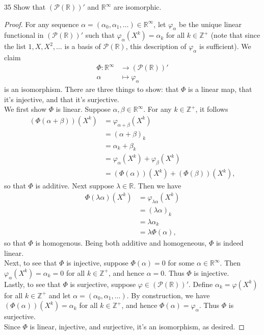\documentclass{extarticle}
\newenvironment{problem}[1]{\begin{prob*}{#1}{}}{\end{prob*}}
\newcommand{\Z}{\mathbb{Z}}
\newcommand{\R}{\mathbb{R}}
\newcommand{\poly}{\mathcal{P}}
\begin{document}
\begin{problem}{35}
Show that $(\poly(\R))'$ and $\R^\infty$ are isomorphic.
\end{problem}
\begin{proof}
For any sequence $\alpha = (\alpha_0,\alpha_1,\dots)\in\R^\infty$, let $\varphi_\alpha$ be the unique linear functional in $(\poly(\R))'$ such that $\varphi_\alpha(X^k) = \alpha_k$ for all $k\in\Z^+$ (note that since the list $1,X,X^2,\dots$ is a basis of $\poly(\R)$, this description of $\varphi_\alpha$ is sufficient).  We claim
\begin{align*}
\Phi: \R^\infty &\to (\poly(\R))'\\
\alpha &\mapsto \varphi_\alpha
\end{align*}
is an isomorphism.  There are three things to show: that $\Phi$ is a linear map, that it's injective, and that it's surjective.\\
\indent We first show $\Phi$ is linear.  Suppose $\alpha,\beta\in \R^\infty$.  For any $k\in\Z^+$, it follows
\begin{align*}
(\Phi(\alpha + \beta))(X^k) &= \varphi_{\alpha+\beta}(X^k)\\
&= (\alpha + \beta)_k\\
&= \alpha_k + \beta_k\\
&= \varphi_\alpha(X^k) + \varphi_\beta(X^k)\\
&= (\Phi(\alpha))(X^k) + (\Phi(\beta))(X^k),
\end{align*}
so that $\Phi$ is additive.  Next suppose $\lambda\in\R$.  Then we have
\begin{align*}
\Phi(\lambda\alpha)(X^k) &= \varphi_{\lambda\alpha}(X^k)\\
&= (\lambda\alpha)_k\\
&= \lambda\alpha_k\\
&= \lambda\Phi(\alpha),
\end{align*}
so that $\Phi$ is homogenous.  Being both additive and homogeneous, $\Phi$ is indeed linear.\\
\indent Next, to see that $\Phi$ is injective, suppose $\Phi(\alpha)= 0$ for some $\alpha\in\R^\infty$.  Then $\varphi_\alpha(X^k) = \alpha_k = 0$ for all $k\in\Z^+$, and hence $\alpha = 0$.  Thus $\Phi$ is injective.\\
\indent Lastly, to see that $\Phi$ is surjective, suppose $\varphi\in (\poly(\R))'$.  Define $\alpha_k=\varphi(X^k)$ for all $k\in\Z^+$ and let $\alpha=(\alpha_0,\alpha_1,\dots)$.  By construction, we have $(\Phi(\alpha))(X^k) = \alpha_k$ for all $k\in\Z^+$, and hence $\Phi(\alpha) = \varphi_\alpha$.  Thus $\Phi$ is surjective.\\
\indent Since $\Phi$ is linear, injective, and surjective, it's an isomorphism, as desired.
\end{proof}
\end{document}
